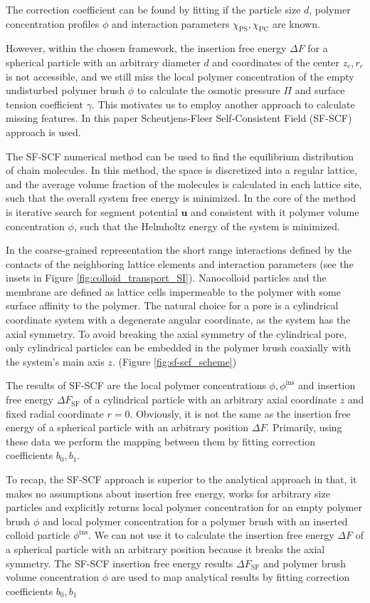 \documentclass[12pt, a4paper]{article}
\begin{document}
The correction coefficient can be found by fitting if the particle size $d$, polymer concentration profiles $\phi$ and interaction parameters $\chi_{\textrm{PS}}, \chi_{\textrm{PC}}$ are known.

However, within the chosen framework, the insertion free energy $\Delta F$ for a spherical particle with an arbitrary diameter $d$ and coordinates of the center $z_c, r_c$ is not accessible, and we still miss the local polymer concentration of the empty undisturbed polymer brush $\phi$ to calculate the osmotic pressure $\Pi$ and surface tension coefficient $\gamma$.
This motivates us to employ another approach to calculate missing features. 
In this paper Scheutjens-Fleer Self-Consistent Field (SF-SCF) approach is used.

The SF-SCF numerical method can be used to find the equilibrium distribution of chain molecules.
In this method, the space is discretized into a regular lattice, and the average volume fraction of the molecules is calculated in each lattice site, such that the overall system free energy is minimized.
In the core of the method is iterative search for segment potential $\mathbf{u}$ and consistent with it polymer volume concentration $\phi$, such that the Helmholtz energy of the system is minimized.

In the coarse-grained representation the short range interactions defined by the contacts of the neighboring lattice elements and interaction parameters (see the insets in Figure \ref{fig:colloid_transport_SI}).
Nanocolloid particles and the membrane are defined as lattice cells impermeable to the polymer with some surface affinity to the polymer.
The natural choice for a pore is a cylindrical coordinate system with a degenerate angular coordinate, as the system has the axial symmetry.
To avoid breaking the axial symmetry of the cylindrical pore, only cylindrical particles can be embedded in the polymer brush coaxially with the system's main axis $z$. (Figure \ref{fig:sf-scf_scheme})

The results of SF-SCF are the local polymer concentrations $\phi, \phi^{\textrm{ins}}$ and insertion free energy $\Delta F_{\textrm{SF}}$ of a cylindrical particle with an arbitrary axial coordinate $z$ and fixed radial coordinate $r=0$. 
Obviously, it is not the same as the insertion free energy of a spherical particle with an arbitrary position $\Delta F$.
Primarily, using these data we perform the mapping between them by fitting correction coefficients $b_0, b_1$.

To recap, the SF-SCF approach is superior to the analytical approach in that, it makes no assumptions about insertion free energy, works for arbitrary size particles and explicitly returns local polymer concentration for an empty polymer brush $\phi$ and local polymer concentration for a polymer brush with an inserted colloid particle $\phi^{\textrm{ins}}$.
We can not use it to calculate the insertion free energy $\Delta F$ of a spherical particle with an arbitrary position because it breaks the axial symmetry. 
The SF-SCF insertion free energy results $\Delta F_{\textrm{SF}}$ and polymer brush volume concentration $\phi$ are used to map analytical results by fitting correction coefficients $b_0, b_1$
\end{document}
